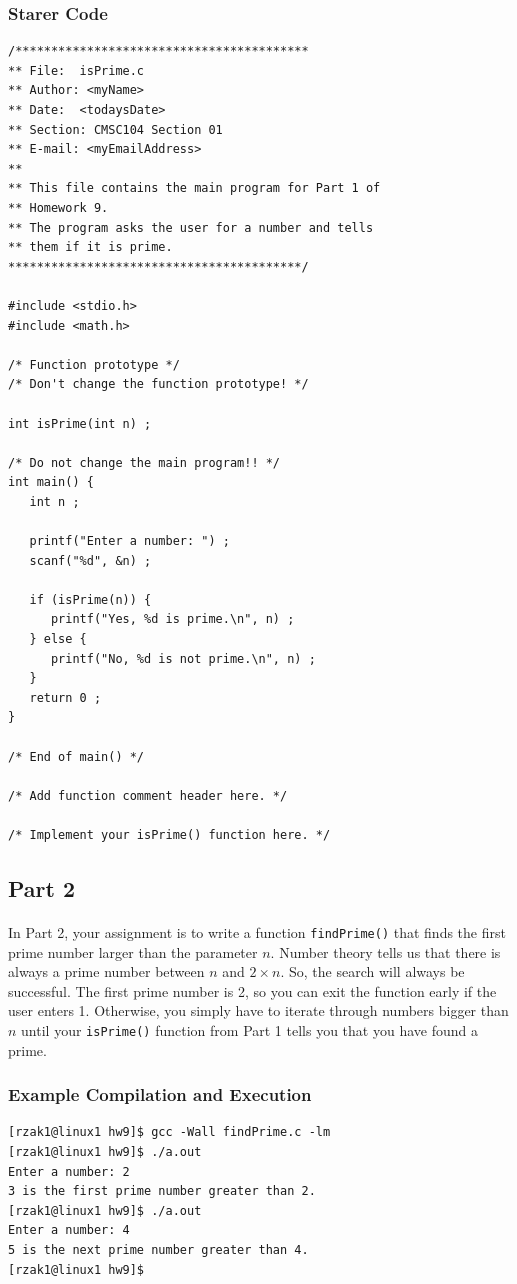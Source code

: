 \documentclass[letter,11pt]{article}
\begin{document}
\subsubsection*{Starer Code}
\begin{verbatim}
/*****************************************
** File:  isPrime.c
** Author: <myName>
** Date:  <todaysDate>
** Section: CMSC104 Section 01
** E-mail: <myEmailAddress>
**
** This file contains the main program for Part 1 of
** Homework 9.
** The program asks the user for a number and tells
** them if it is prime.
*****************************************/

#include <stdio.h>
#include <math.h>

/* Function prototype */
/* Don't change the function prototype! */

int isPrime(int n) ;

/* Do not change the main program!! */
int main() {
   int n ;

   printf("Enter a number: ") ;
   scanf("%d", &n) ;

   if (isPrime(n)) {
      printf("Yes, %d is prime.\n", n) ;
   } else {
      printf("No, %d is not prime.\n", n) ;
   }
   return 0 ;
}

/* End of main() */

/* Add function comment header here. */

/* Implement your isPrime() function here. */
\end{verbatim}

\subsection*{Part 2}
\paragraph{}In Part 2, your assignment is to write a function \texttt{findPrime()} that finds the first prime number larger than the parameter $n$. Number theory tells us that there is always a prime number between $n$ and $2 \times n$. So, the search will always be successful. The first prime number is 2, so you can exit the function early if the user enters 1. Otherwise, you simply have to iterate through numbers bigger than $n$ until your \texttt{isPrime()} function from Part 1 tells you that you have found a prime.

\subsubsection*{Example Compilation and Execution}
\begin{verbatim}
[rzak1@linux1 hw9]$ gcc -Wall findPrime.c -lm
[rzak1@linux1 hw9]$ ./a.out
Enter a number: 2
3 is the first prime number greater than 2.
[rzak1@linux1 hw9]$ ./a.out
Enter a number: 4
5 is the next prime number greater than 4.
[rzak1@linux1 hw9]$
\end{verbatim}
\end{document}
